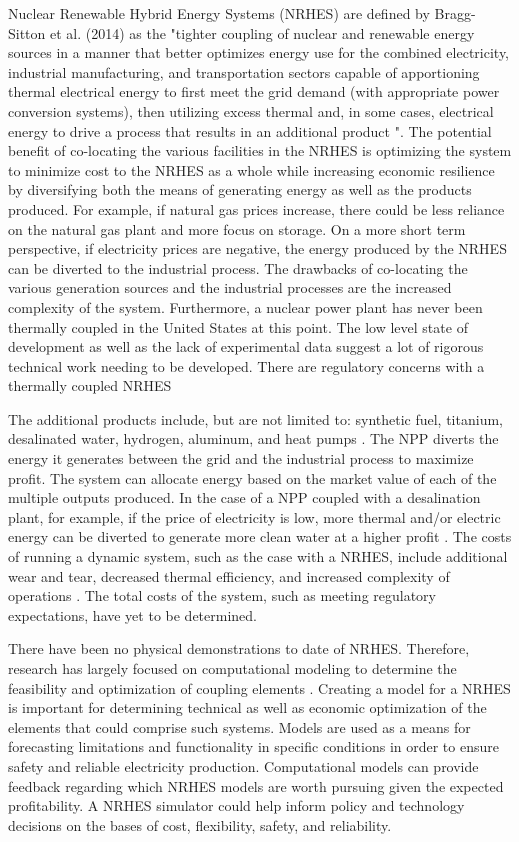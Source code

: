 \documentclass{article}                                                                           %
\begin{document}
\begin{linenumbers}
Nuclear Renewable Hybrid Energy Systems (NRHES) are defined by Bragg-Sitton et al. (2014) as the "tighter coupling of nuclear and renewable energy sources in a manner that better optimizes energy use for the combined electricity, industrial manufacturing, and transportation sectors capable of apportioning thermal electrical energy to first meet the grid demand (with appropriate power conversion systems), then utilizing excess thermal and, in some cases, electrical energy to drive a process that results in an additional product \cite {Bragg-Sitton2014}".  The potential benefit of co-locating the various facilities in the NRHES is optimizing the system to minimize cost to the NRHES as a whole while increasing economic resilience by diversifying both the means of generating energy as well as the products produced. For example, if natural gas prices increase, there could be less reliance on the natural gas plant and more focus on storage.  On a more short term perspective, if electricity prices are negative, the energy produced by the NRHES can be diverted to the industrial process. The drawbacks of co-locating the various generation sources and the industrial processes are the increased complexity of the system.  Furthermore, a nuclear power plant has never been thermally coupled in the United States at this point.  The low level state of development as well as the lack of experimental data suggest a lot of rigorous technical work needing to be developed.  There are regulatory concerns with a thermally coupled NRHES

The additional products include, but are not limited to: synthetic fuel, titanium, desalinated water, hydrogen, aluminum, and heat pumps \cite{Bienvenue2015}. The NPP diverts the energy it generates between the grid and the industrial process to maximize profit. The system can allocate energy based on the market value of each of the multiple outputs produced. In the case of a NPP coupled with a desalination plant, for example, if the price of electricity is low, more thermal and/or electric energy can be diverted to generate more clean water at a higher profit \cite {Chen2016}. The costs of running a dynamic system, such as the case with a NRHES, include additional wear and tear, decreased thermal efficiency, and increased complexity of operations \cite{Garcia2013}. The total costs of the system, such as meeting regulatory expectations, have yet to be determined.

There have been no physical demonstrations to date of NRHES. Therefore, research has largely focused on computational modeling to determine the feasibility and optimization of coupling elements \cite{Boardman2013, Shropshire2012}. Creating a model for a NRHES is important for determining technical as well as economic optimization of the elements that could comprise such systems. Models are used as a means for forecasting limitations and functionality in specific conditions in order to ensure safety and reliable electricity production. Computational models can provide feedback regarding which NRHES models are worth pursuing given the expected profitability. A NRHES simulator could help inform policy and technology decisions on the bases of cost, flexibility, safety, and reliability.


\end{linenumbers}
\end{document}
